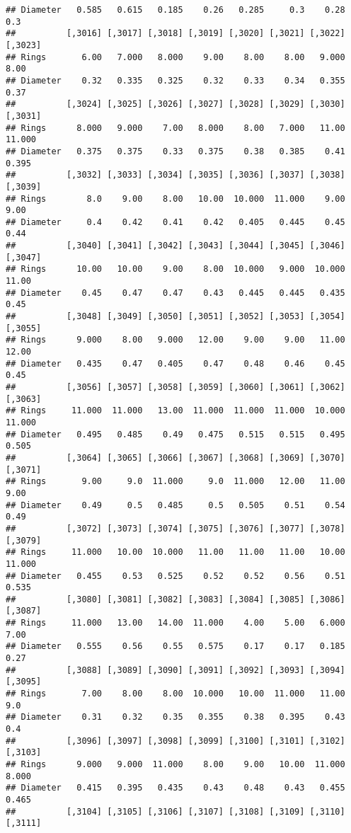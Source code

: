 \documentclass[
]{article}
\begin{document}
\begin{verbatim}
## Diameter   0.585   0.615   0.185    0.26   0.285     0.3    0.28     0.3
##          [,3016] [,3017] [,3018] [,3019] [,3020] [,3021] [,3022] [,3023]
## Rings       6.00   7.000   8.000    9.00    8.00    8.00   9.000    8.00
## Diameter    0.32   0.335   0.325    0.32    0.33    0.34   0.355    0.37
##          [,3024] [,3025] [,3026] [,3027] [,3028] [,3029] [,3030] [,3031]
## Rings      8.000   9.000    7.00   8.000    8.00   7.000   11.00  11.000
## Diameter   0.375   0.375    0.33   0.375    0.38   0.385    0.41   0.395
##          [,3032] [,3033] [,3034] [,3035] [,3036] [,3037] [,3038] [,3039]
## Rings        8.0    9.00    8.00   10.00  10.000  11.000    9.00    9.00
## Diameter     0.4    0.42    0.41    0.42   0.405   0.445    0.45    0.44
##          [,3040] [,3041] [,3042] [,3043] [,3044] [,3045] [,3046] [,3047]
## Rings      10.00   10.00    9.00    8.00  10.000   9.000  10.000   11.00
## Diameter    0.45    0.47    0.47    0.43   0.445   0.445   0.435    0.45
##          [,3048] [,3049] [,3050] [,3051] [,3052] [,3053] [,3054] [,3055]
## Rings      9.000    8.00   9.000   12.00    9.00    9.00   11.00   12.00
## Diameter   0.435    0.47   0.405    0.47    0.48    0.46    0.45    0.45
##          [,3056] [,3057] [,3058] [,3059] [,3060] [,3061] [,3062] [,3063]
## Rings     11.000  11.000   13.00  11.000  11.000  11.000  10.000  11.000
## Diameter   0.495   0.485    0.49   0.475   0.515   0.515   0.495   0.505
##          [,3064] [,3065] [,3066] [,3067] [,3068] [,3069] [,3070] [,3071]
## Rings       9.00     9.0  11.000     9.0  11.000   12.00   11.00    9.00
## Diameter    0.49     0.5   0.485     0.5   0.505    0.51    0.54    0.49
##          [,3072] [,3073] [,3074] [,3075] [,3076] [,3077] [,3078] [,3079]
## Rings     11.000   10.00  10.000   11.00   11.00   11.00   10.00  11.000
## Diameter   0.455    0.53   0.525    0.52    0.52    0.56    0.51   0.535
##          [,3080] [,3081] [,3082] [,3083] [,3084] [,3085] [,3086] [,3087]
## Rings     11.000   13.00   14.00  11.000    4.00    5.00   6.000    7.00
## Diameter   0.555    0.56    0.55   0.575    0.17    0.17   0.185    0.27
##          [,3088] [,3089] [,3090] [,3091] [,3092] [,3093] [,3094] [,3095]
## Rings       7.00    8.00    8.00  10.000   10.00  11.000   11.00     9.0
## Diameter    0.31    0.32    0.35   0.355    0.38   0.395    0.43     0.4
##          [,3096] [,3097] [,3098] [,3099] [,3100] [,3101] [,3102] [,3103]
## Rings      9.000   9.000  11.000    8.00    9.00   10.00  11.000   8.000
## Diameter   0.415   0.395   0.435    0.43    0.48    0.43   0.455   0.465
##          [,3104] [,3105] [,3106] [,3107] [,3108] [,3109] [,3110] [,3111]

\end{verbatim}
\end{document}
